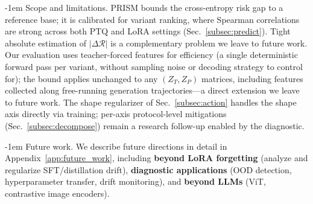\documentclass{article} %
\makeatletter
\newlength{\paraSpace}
\renewcommand{\paragraph}{\@startsection{paragraph}{4}{\z@}%
  {\paraSpace}{-1em}%
  {\normalfont\normalsize\bfseries}}
\makeatother
\begin{document}
\paragraph{Scope and limitations.}
PRISM bounds the cross-entropy risk gap to a reference base; it is calibrated for variant ranking, where Spearman correlations are strong across both PTQ and LoRA settings (Sec.~\ref{subsec:predict}). Tight absolute estimation of $|\Delta\mathcal{R}|$ is a complementary problem we leave to future work. Our evaluation uses teacher-forced features for efficiency (a single deterministic forward pass per variant, without sampling noise or decoding strategy to control for); the bound applies unchanged to any $(Z_T, Z_P)$ matrices, including features collected along free-running generation trajectories---a direct extension we leave to future work. The shape regularizer of Sec.~\ref{subsec:action} handles the shape axis directly via training; per-axis protocol-level mitigations (Sec.~\ref{subsec:decompose}) remain a research follow-up enabled by the diagnostic.

\paragraph{Future work.}
We describe future directions in detail in Appendix~\ref{app:future_work}, including \textbf{beyond LoRA forgetting} (analyze and regularize SFT/distillation drift), \textbf{diagnostic applications} (OOD detection, hyperparameter transfer, drift monitoring), and \textbf{beyond LLMs} (ViT, contrastive image encoders).


\end{document}
